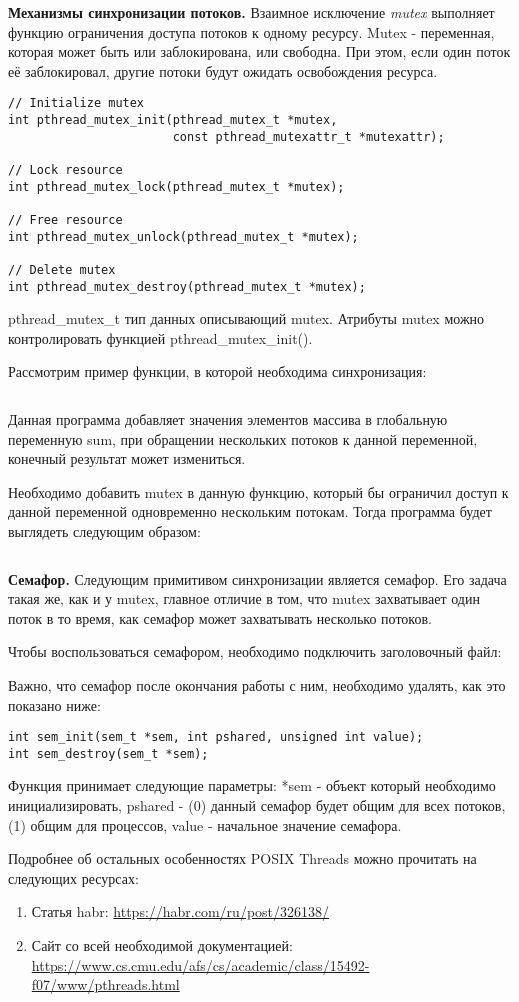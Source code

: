 \textbf{Механизмы синхронизации потоков.} Взаимное исключение \textit{mu\-tex} выполняет функцию ограничения доступа потоков к одному ресурсу. Mutex - переменная, которая может быть или заблокирована, или свободна. При этом, если один поток её заблокировал, другие потоки будут ожидать освобождения ресурса.

\begin{verbatim}
// Initialize mutex
int pthread_mutex_init(pthread_mutex_t *mutex, 
                       const pthread_mutexattr_t *mutexattr);

// Lock resource
int pthread_mutex_lock(pthread_mutex_t *mutex);

// Free resource
int pthread_mutex_unlock(pthread_mutex_t *mutex);

// Delete mutex
int pthread_mutex_destroy(pthread_mutex_t *mutex);
\end{verbatim}

pthread\_mutex\_t тип данных описывающий mutex. Атрибуты mu\-tex можно контролировать функцией
pthread\_mutex\_init().

Рассмотрим пример функции, в которой необходима синхронизация:

\inputminted{c++}{listings/WithoutMutex.c}

Данная программа добавляет значения элементов массива в глобальную переменную sum, при обращении нескольких потоков к данной переменной, конечный результат может измениться.

Необходимо добавить mutex в данную функцию, который бы ограничил доступ к данной переменной одновременно нескольким потокам. Тогда программа будет выглядеть следующим образом:

\inputminted{c++}{listings/WithMutex.c}

\textbf{Семафор.} Следующим примитивом синхронизации является семафор. Его задача такая же, как и у mutex, главное отличие в том, что mutex захватывает один поток в то время, как семафор может захватывать несколько потоков.

Чтобы воспользоваться семафором, необходимо подключить заголовочный файл:

Важно, что семафор после окончания работы с ним, необходимо удалять, как это показано ниже:

\begin{verbatim}
int sem_init(sem_t *sem, int pshared, unsigned int value);
int sem_destroy(sem_t *sem);
\end{verbatim}

Функция  принимает следующие параметры: *sem - объект который необходимо инициализировать, pshared - (0) данный семафор будет общим для всех потоков, (1) общим для процессов, value - начальное значение семафора.

Подробнее об остальных особенностях POSIX Threads можно прочитать на следующих ресурсах:

\begin{enumerate}
    \item Статья habr: \url{https://habr.com/ru/post/326138/}
    \item Сайт со всей необходимой документацией: \url{https://www.cs.cmu.edu/afs/cs/academic/class/15492-f07/www/pthreads.html}
\end{enumerate}
